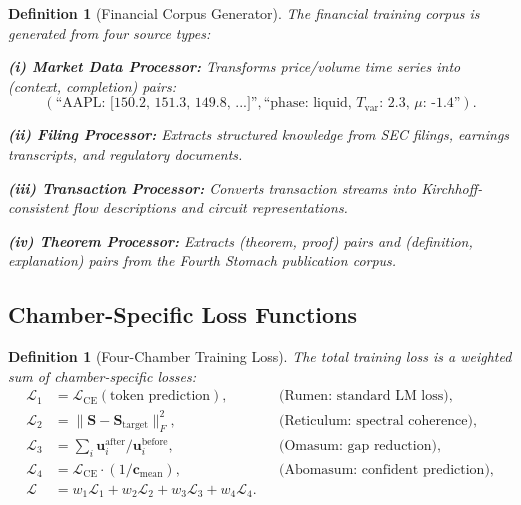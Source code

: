 \documentclass[twocolumn,10pt]{article}
\newtheorem{definition}[theorem]{Definition}
\theoremstyle{remark}
\begin{document}
\begin{definition}[Financial Corpus Generator]
\label{def:financial_corpus}
The financial training corpus is generated from four source types:

\textbf{(i) Market Data Processor:} Transforms price/volume time series into (context, completion) pairs:
\begin{equation}
    (\text{``AAPL: [150.2, 151.3, 149.8, ...]''}, \text{``phase: liquid, } T_{\text{var}}\text{: 2.3, } \mu\text{: -1.4''}).
\end{equation}

\textbf{(ii) Filing Processor:} Extracts structured knowledge from SEC filings, earnings transcripts, and regulatory documents.

\textbf{(iii) Transaction Processor:} Converts transaction streams into Kirchhoff-consistent flow descriptions and circuit representations.

\textbf{(iv) Theorem Processor:} Extracts (theorem, proof) pairs and (definition, explanation) pairs from the Fourth Stomach publication corpus.
\end{definition}

\subsection{Chamber-Specific Loss Functions}

\begin{definition}[Four-Chamber Training Loss]
\label{def:loss}
The total training loss is a weighted sum of chamber-specific losses:
\begin{align}
    \mathcal{L}_1 &= \mathcal{L}_{\text{CE}}(\text{token prediction}), & &\text{(Rumen: standard LM loss)}, \\
    \mathcal{L}_2 &= \|\mathbf{S} - \mathbf{S}_{\text{target}}\|_F^2, & &\text{(Reticulum: spectral coherence)}, \\
    \mathcal{L}_3 &= \sum_i \mathbf{u}_i^{\text{after}} / \mathbf{u}_i^{\text{before}}, & &\text{(Omasum: gap reduction)}, \\
    \mathcal{L}_4 &= \mathcal{L}_{\text{CE}} \cdot (1/\mathbf{c}_{\text{mean}}), & &\text{(Abomasum: confident prediction)}, \\
    \mathcal{L} &= w_1\mathcal{L}_1 + w_2\mathcal{L}_2 + w_3\mathcal{L}_3 + w_4\mathcal{L}_4. & &
    \label{eq:total_loss}
\end{align}
\end{definition}
\end{document}
